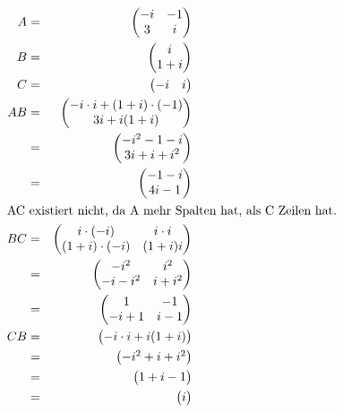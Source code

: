 \documentclass[10pt,a4paper,oneside,ngerman,numbers=noenddot]{scrartcl}
\begin{document}
\subsection{} %
\begin{alignat*}{2}
A &=& \begin{pmatrix}-i & -1 \\
3 & i \end{pmatrix} \\
B &=& \begin{pmatrix} i \\
1 + i\end{pmatrix} \\
C &=& \begin{pmatrix}-i & i \end{pmatrix} \\
AB &=& \begin{pmatrix}-i \cdot i + (1+i)\cdot (-1) \\
3i + i(1+i) \end{pmatrix} \\
&=& \begin{pmatrix}-i^{2} - 1 - i \\
3i + i + i^{2} \end{pmatrix} \\
&=& \begin{pmatrix}- 1 - i \\
4i - 1 \end{pmatrix} \\
\intertext{AC existiert nicht, da A mehr Spalten hat, als C Zeilen hat.}
BC &=& \begin{pmatrix}i \cdot (-i) & i \cdot i \\
(1+i) \cdot (-i) & (1+i)i \end{pmatrix} \\
&=& \begin{pmatrix}-i^{2} & i^{2} \\
-i - i^{2} & i + i^{2} \end{pmatrix} \\
&=& \begin{pmatrix}1 & -1 \\
-i +1 & i -1 \end{pmatrix} \\
CB &=& \begin{pmatrix}-i \cdot i + i(1+i) \end{pmatrix} \\
&=& \begin{pmatrix}-i^{2} + i + i^{2} \end{pmatrix} \\
&=& \begin{pmatrix}1 + i -1 \end{pmatrix} \\
&=& \begin{pmatrix}i \end{pmatrix}
\end{alignat*}
\end{document}
